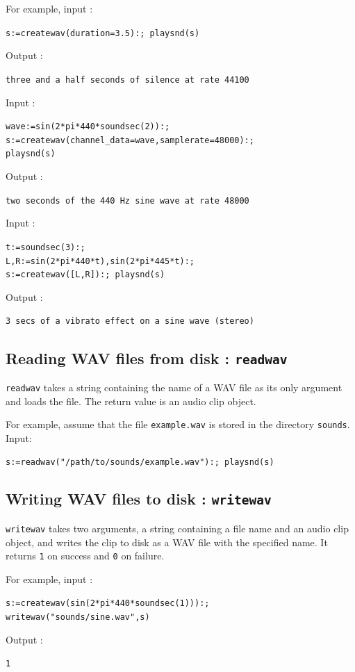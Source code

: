 \documentclass[a4paper,11pt]{book}
\begin{document}
For example, input :
\begin{center}
  {\tt s:=createwav(duration=3.5):; playsnd(s)}
\end{center}
Output :
\begin{center}
  {\tt three and a half seconds of silence at rate 44100}
\end{center}
Input :
\begin{center}
  {\tt wave:=sin(2*pi*440*soundsec(2)):;\\s:=createwav(channel\_data=wave,samplerate=48000):;\\playsnd(s)}
\end{center}
Output :
\begin{center}
  {\tt two seconds of the 440 Hz sine wave at rate 48000}
\end{center}
Input :
\begin{center}
  {\tt t:=soundsec(3):;\\L,R:=sin(2*pi*440*t),sin(2*pi*445*t):;\\s:=createwav([L,R]):; playsnd(s)}
\end{center}
Output :
\begin{center}
  {\tt 3 secs of a vibrato effect on a sine wave (stereo)}
\end{center}
%
\subsection{Reading WAV files from disk : {\tt readwav}}
{\tt readwav} takes a string containing the name of a WAV file as its only argument and loads the file. The return value is an audio clip object.

For example, assume that the file {\tt example.wav} is stored in the directory {\tt sounds}. Input:
\begin{center}
  {\tt s:=readwav("/path/to/sounds/example.wav"):; playsnd(s)}
\end{center}

\subsection{Writing WAV files to disk : {\tt writewav}}
{\tt writewav} takes two arguments, a string containing a file name and an audio clip object, and writes the clip to disk as a WAV file with the specified name. It returns {\tt 1} on success and {\tt 0} on failure.

For example, input :
\begin{center}
  {\tt s:=createwav(sin(2*pi*440*soundsec(1))):;\\writewav("sounds/sine.wav",s)}
\end{center}
Output :
\begin{center}
  {\tt 1}
\end{center}
\end{document}
